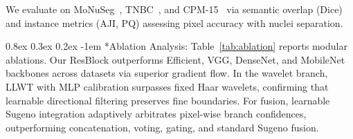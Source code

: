 \documentclass{article}
\makeatletter
\renewcommand\paragraph{\@startsection{paragraph}{4}{0pt}%
  {0.8ex \@plus 0.3ex \@minus 0.2ex}%
  {-1em}%
  {\normalsize\bfseries}}
\makeatother
\begin{document}
We evaluate on MoNuSeg~\cite{MoNuSeg}, TNBC~\cite{tnbc}, and CPM-15~\cite{CPM-15} via semantic overlap (Dice) and instance metrics (AJI, PQ) assessing pixel accuracy with nuclei separation.

\paragraph*{Ablation Analysis:}
Table~\ref{tab:ablation} reports modular ablations. Our ResBlock outperforms Efficient, VGG, DenseNet, and MobileNet backbones across datasets via superior gradient flow. In the wavelet branch, LLWT with MLP calibration surpasses fixed Haar wavelets, confirming that learnable directional filtering preserves fine boundaries. For fusion, learnable Sugeno integration adaptively arbitrates pixel-wise branch confidences, outperforming concatenation, voting, gating, and standard Sugeno fusion.
\end{document}
